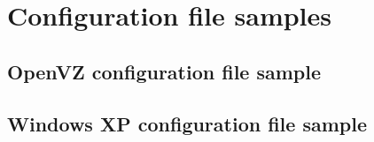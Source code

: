 \chapter{Configuration file samples}
\label{chapter:conf-samples}

\lstset{language=python}

\section{OpenVZ configuration file sample}
\label{sec:openvz-samples}

\lstset{caption=OpenVZ configuration file sample, label=lst:openvz-sample}


\newpage

\section{Windows XP configuration file sample}
\label{sec:winxp-samples}

\lstset{caption=Windows XP configuration file sample, label=lst:winxp-sample}
